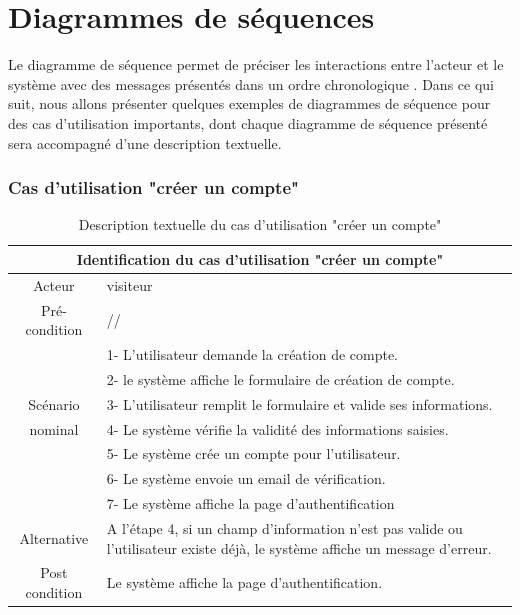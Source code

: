 \documentclass[edit,12pt,a4paper,ChapStyle,oneside,doubleinterligne]{report}
\begin{document}
\section{Diagrammes de séquences}

Le diagramme de séquence permet de préciser les interactions entre l'acteur et le système avec des messages présentés dans un ordre chronologique 
\cite{séquences}.
\newline Dans ce qui suit, nous allons présenter quelques exemples de diagrammes de séquence pour des cas d'utilisation importants, dont chaque diagramme de séquence présenté sera accompagné d'une description textuelle.
\subsubsection{Cas d'utilisation "créer un compte"}
\begin{table}[h!]
    \centering
    \begin{tabular}{|c|m{10cm}|}
    \hline
         \multicolumn{2}{|c|}{Identification du cas d'utilisation "créer un compte" }\\
         \hline
         Acteur & visiteur\\
         \hline
         Pré-condition & // \\
         \hline
          & 1- L’utilisateur demande la création de compte.\\
          & 2- le système affiche le formulaire de création de compte. \\
         Scénario & 3- L’utilisateur remplit le formulaire et valide ses informations.  \\
         nominal& 4- Le système vérifie la validité des informations saisies.\\
          & 5- Le système crée un compte pour l’utilisateur.\\
          & 6- Le système envoie un email de vérification. \\
          & 7- Le système affiche la page d’authentification \\
         \hline
         Alternative  & A l’étape 4, si un champ d’information n’est pas valide ou
         l’utilisateur existe déjà, le système affiche un message d’erreur.\\
         \hline
         Post condition& Le système affiche la page d’authentification.  \\
         \hline
    \end{tabular}
    \caption{Description textuelle du cas d'utilisation "créer un compte" }
    \label{tab:cas1}
\end{table}
\end{document}

